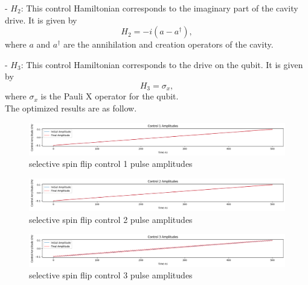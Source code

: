 \documentclass{article}
\begin{document}
   - $H_2$: This control Hamiltonian corresponds to the imaginary part of the cavity drive. It is given by
     \begin{equation}
     H_2 = -i\left(a - a^\dagger\right),
     \end{equation}
     where $a$ and $a^\dagger$ are the annihilation and creation operators of the cavity.

   - $H_3$: This control Hamiltonian corresponds to the drive on the qubit. It is given by
     \begin{equation}
     H_3 = \sigma_x,
     \end{equation}
     where $\sigma_x$ is the Pauli X operator for the qubit.
\\
The optimized results are as follow. 
\begin{figure}[H]
    \centering
    \includegraphics[width=0.6\linewidth]{selective_spin_flip_GRAPE_500,_100_000_LIN_constraints_control1.png}
    \caption{selective spin flip control 1 pulse amplitudes}
    \label{fig:selective_spin_flip_constrains_control1}
\end{figure}
\begin{figure}[H]
    \centering
    \includegraphics[width=0.6\linewidth]{selective_spin_flip_GRAPE_500,_100_000_LIN_constraints_control2.png}
    \caption{selective spin flip control 2 pulse amplitudes}
    \label{fig:selective_spin_flip_constrains_control2}
\end{figure}
\begin{figure}[H]
    \centering
    \includegraphics[width=0.6\linewidth]{selective_spin_flip_GRAPE_500,_100_000_LIN_constraints_control3.png}
    \caption{selective spin flip control 3 pulse amplitudes}
    \label{fig:selective_spin_flip_constrains_control3}
\end{figure}
\end{document}
